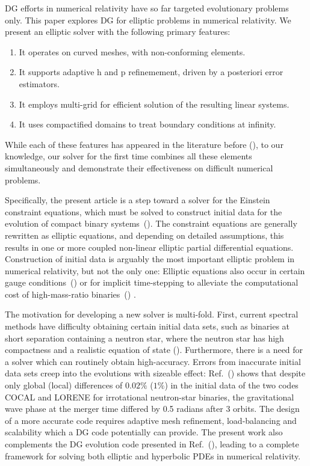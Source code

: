 DG efforts in numerical relativity have so far
targeted evolutionary problems only.
This paper explores DG for elliptic problems in numerical relativity.
We present an elliptic solver with the following primary features:
\begin{enumerate}
\item It operates on curved meshes, with non-conforming elements.
\item It supports adaptive h and p refinemement, driven by a
  posteriori error estimators.
\item It employs multi-grid for efficient solution of the resulting
  linear systems.
\item It uses compactified domains to treat boundary conditions at infinity.
\end{enumerate}
While each of these features has appeared in the literature before
(\cite{arnold.d;brezzi.f;cockburn.b;marini.l2002,stiller2017robust,hesthaven2008nodal,kronbichler2018performance,fick2014interior,kozdon2018energy,kozdon2019robust}), to our knowledge, our solver for the first
time combines all these elements simultaneously and demonstrate their
effectiveness on difficult numerical problems.

Specifically, the present article is a step 
toward a solver for the Einstein constraint
equations, which must be solved to
construct initial data for the evolution of compact binary
systems~(\cite{pfeiffer:2005,cook2000,baumgarte2010numerical}).  The
constraint equations are generally rewritten as elliptic equations,
and depending on detailed assumptions, this results in one or more
coupled non-linear elliptic partial differential equations.
Construction of initial data is arguably the most important
elliptic problem in numerical relativity, but not the only one:
Elliptic equations also occur in certain gauge
conditions~(\cite{baumgarte2010numerical}) or for implicit
time-stepping to alleviate the computational cost of high-mass-ratio
binaries~(\cite{laupfeiffer2008,lau:2011we})
.
%

The motivation for developing
a new solver is multi-fold. First, current spectral methods have
difficulty obtaining certain initial data sets, such as binaries at
short separation containing a neutron star, where the neutron star has
high compactness and a realistic equation of state
(\cite{henriksson:2014tba}).  Furthermore, there is a need for a
solver which can routinely obtain high-accuracy. Errors from
inaccurate initial data sets creep into the evolutions with sizeable
effect: Ref.~(\cite{tsokaros2016initialfixed}) shows that despite only
global (local) differences of $0.02\%$ ($1\%$) in the initial data of
the two codes COCAL and LORENE for irrotational neutron-star binaries,
the gravitational wave phase at the merger time differed by 0.5
radians after 3 orbits. The design of a more accurate code requires adaptive mesh refinement, load-balancing and
scalability which a DG code potentially can
provide. The present work also complements the DG evolution code presented in Ref.~(\cite{kidder:16}),
leading to a complete framework for solving both
elliptic and hyperbolic PDEs in numerical relativity.
%

